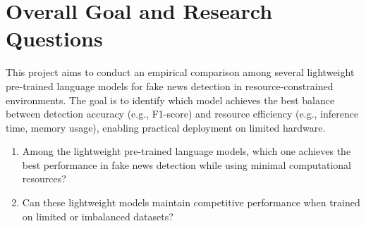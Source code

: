 \documentclass{article}
\begin{document}
\section{Overall Goal and Research Questions}
This project aims to conduct an empirical comparison among several lightweight pre-trained language models for fake news detection in resource-constrained environments. The goal is to identify which model achieves the best balance between detection accuracy (e.g., F1-score) and resource efficiency (e.g., inference time, memory usage), enabling practical deployment on limited hardware.

\begin{enumerate}
    \item Among the lightweight pre-trained language models, which one achieves the best performance in fake news detection while using minimal computational resources?
    \item Can these lightweight models maintain competitive performance when trained on limited or imbalanced datasets?
\end{enumerate}
\end{document}
